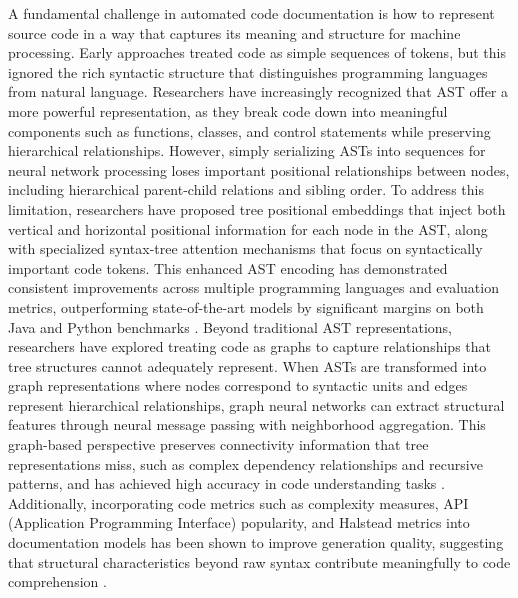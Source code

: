A fundamental challenge in automated code documentation is how to represent source code in a way that captures its meaning and structure for machine processing. Early approaches treated code as simple sequences of tokens, but this ignored the rich syntactic structure that distinguishes programming languages from natural language. Researchers have increasingly recognized that AST offer a more powerful representation, as they break code down into meaningful components such as functions, classes, and control statements while preserving hierarchical relationships. However, simply serializing ASTs into sequences for neural network processing loses important positional relationships between nodes, including hierarchical parent-child relations and sibling order. To address this limitation, researchers have proposed tree positional embeddings that inject both vertical and horizontal positional information for each node in the AST, along with specialized syntax-tree attention mechanisms that focus on syntactically important code tokens. This enhanced AST encoding has demonstrated consistent improvements across multiple programming languages and evaluation metrics, outperforming state-of-the-art models by significant margins on both Java and Python benchmarks \cite{Song2024}. Beyond traditional AST representations, researchers have explored treating code as graphs to capture relationships that tree structures cannot adequately represent. When ASTs are transformed into graph representations where nodes correspond to syntactic units and edges represent hierarchical relationships, graph neural networks can extract structural features through neural message passing with neighborhood aggregation. This graph-based perspective preserves connectivity information that tree representations miss, such as complex dependency relationships and recursive patterns, and has achieved high accuracy in code understanding tasks \cite{Rozi2023}. Additionally, incorporating code metrics such as complexity measures, API (Application Programming Interface) popularity, and Halstead metrics into documentation models has been shown to improve generation quality, suggesting that structural characteristics beyond raw syntax contribute meaningfully to code comprehension \cite{Mostafavi2024}.

